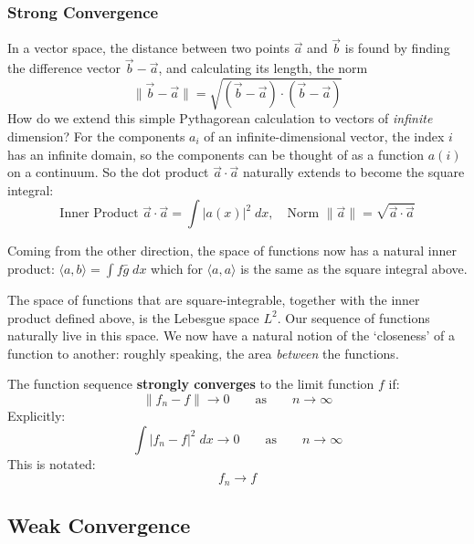 \documentclass[a4paper]{report}
\begin{document}
\subsubsection*{Strong Convergence}

In a vector space, the distance between two points $\vec{a}$ and $\vec{b}$ is found by finding the difference vector $\vec{b} - \vec{a}$, and calculating its length, the norm 
\begin{equation}
\lVert  \vec{b} - \vec{a} \rVert = \sqrt{(\vec{b} - \vec{a})\cdot (\vec{b} - \vec{a})}
\end{equation}
How do we extend this simple Pythagorean calculation to vectors of \emph{infinite} dimension? For the components $a_i$ of an infinite-dimensional vector, the index $i$ has an infinite domain, so the components can be thought of as a function $a(i)$ on a continuum. So the dot product $\vec{a} \cdot \vec{a}$ naturally extends to become the square integral:
\begin{equation}
\text{Inner Product } \vec{a} \cdot \vec{a} = \int \lvert a(x) \rvert^2 \;dx,
\quad \text{Norm } \lVert \vec{a} \rVert = \sqrt{\vec{a} \cdot \vec{a} }
\end{equation}

Coming from the other direction, the space of functions now has a natural inner product: $ \langle a,b \rangle = \int f \bar{g}\; dx $ which for $\langle a,a \rangle$ is the same as the square integral above.

The space of functions that are square-integrable, together with the inner product defined above, is the Lebesgue space $L^2$.  Our sequence of functions naturally live in this space.  We now have a natural notion of the `closeness' of a function to another: roughly speaking, the area \emph{between} the functions.

The function sequence \textbf{strongly converges} to the limit function $f$ if:
\begin{equation}
\lVert f_n - f \rVert \to 0 \qquad \text{as} \qquad n \to \infty
\end{equation}
Explicitly:
\begin{equation}
\int \lvert f_n - f \rvert^2 \;dx  \to 0 \qquad \text{as} \qquad n \to \infty
\end{equation}
This is notated:
\begin{equation}
f_n \to f
\end{equation}



\subsection*{Weak Convergence}
\end{document}
